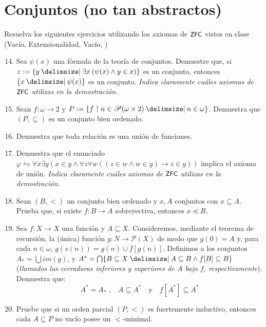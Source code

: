 \documentclass[11pt]{article}
\providecommand\st{\;|\;}
\newcommand\SetSymbol[1][]{%
    \nonscript\:#1\vert
    \allowbreak
    \nonscript\:
    \mathopen{}}
\renewcommand\st{\SetSymbol[\delimsize]}
\renewcommand\st{\SetSymbol[\delimsize]}
\newcommand{\set}[1]{\{#1\}}
\newcommand{\zfc}{\text{\textsf{\small ZFC}}}
\begin{document}
    \section*{Conjuntos (no tan abstractos)}
    Resuelva los siguientes ejercicios utilizando los axiomas de $\zfc$ vistos en clase (Vacío, Extensionalidad, Vacío, )
    \begin{enumerate}[\bf\text{Ej.} 1.]
    \setcounter{enumi}{13}

    \item Sea $\psi(x)$ una fórmula de la teoría de conjuntos. Demuestre que, si $z:=\{ y \st \exists x \: (\psi(x) \land y \in x) \}$ es un conjunto, entonces $\{x \st \psi(x)\}$ es un conjunto.
    \textit{Indica claramente cuáles axiomas de $\zfc$ utilizas en la demostración.}

    \item Sean $f:\omega \to 2$ y $P:=\{ f \upharpoonright n \in \mathscr{P}(\omega \times 2) \st n \in \omega \}$. Demuestra que $(P,\subseteq)$ es un conjunto bien ordenado.

    \item Demuestra que toda relación es una unión de funciones.

    \item Demuestra que el enunciado $\varphi \leftrightharpoons \forall x\exists y (x\in y \wedge \forall z \forall w ((z\in w \wedge w\in y) \rightarrow z\in y))$ implica el axioma de unión.
    \textit{Indica claramente cuáles axiomas de $\zfc$ utilizas en la demostración.}

    \item Sean $(B,<)$ un conjunto bien ordenado y $x,A$ conjuntos con $x \subseteq A$. Prueba que, si existe $f:B \to A$ sobreyectiva, entonces $x \preccurlyeq B$.    

    \item Sea $f\colon X\to X$ una función y $A\subseteq X$. Consideremos, mediante el teorema de recursión, la  (única) función $g\colon N\to \mathscr{P}(X)$ de modo que $g(0) = A$ y, para cada $n \in \omega$, $g(s(n)) = g(n)\cup f[g(n)]$.
    Definimos a los conjuntos $A_*=\bigcup im(g)$, y $A^*= \bigcap\set{B\subseteq X \st A\subseteq B \wedge f[B]\subseteq B}$ (\textit{llamados las cerraduras inferiores y superiores de $A$ bajo $f$, respectivamente}). Demuestra que:
    $$ A^*=A_* \text{ ,} \quad A\subseteq A^* \quad \text{y} \quad f[A^*]\subseteq A^* $$

    \item Pruebe que si un orden parcial $(P,<)$ es fuertemente inductivo, entonces cada $A \subseteq P$ no vacío posee un $<$-minimal.



\end{enumerate}
\end{document}
